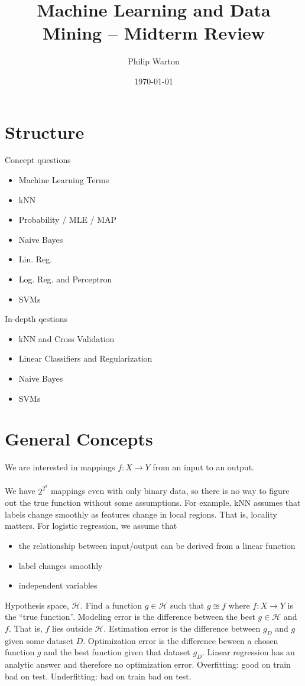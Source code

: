 \documentclass{article}
\theoremstyle{definition}
\begin{document}
\title{Machine Learning and Data Mining -- Midterm Review}
\author{Philip Warton}
\date{\today}
\maketitle
\section*{Structure}
Concept questions
\begin{itemize}
    \item Machine Learning Terms 
    \item kNN
    \item Probability / MLE / MAP
    \item Naive Bayes
    \item Lin. Reg.
    \item Log. Reg. and Perceptron
    \item SVMs
\end{itemize}
In-depth qestions
\begin{itemize}
    \item kNN and Cross Validation
    \item Linear Classifiers and Regularization
    \item Naive Bayes
    \item SVMs
\end{itemize}
\section*{General Concepts}
We are interested in mappings $f:X \rightarrow Y$ from an input to an output.\\\\
We have $2^{2^d}$ mappings even with only binary data, so there is no way to figure out the true function without 
some assumptions.
For example, kNN assumes that labels change smoothly as features change in local regions. That is, locality matters.
For logistic regression, we assume that
\begin{itemize}
    \item the relationship between input/output can be derived from a linear function
    \item label changes smoothly
    \item independent variables
\end{itemize}
Hypothesis space, $\mathcal{H}$. Find a function $g \in \mathcal{H}$ such that $g \approxeq f$ where 
$f:X \rightarrow Y$ is the ``true function''.
Modeling error is the difference between the best $g \in \mathcal{H}$ and $f$. That is, $f$ lies outside $\mathcal{H}$.
Estimation error is the difference between $g_D$ and $g$ given some dataset $D$. Optimization error is the 
difference beween a chosen function $g$ and the best function given that dataset $g_D$. Linear regression 
has an analytic answer and therefore no optimization error.
Overfitting: good on train bad on test. Underfitting: bad on train bad on test.
\end{document}
